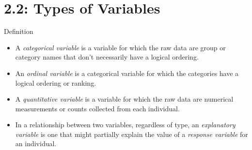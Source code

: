 \documentclass[Lecture.tex]{subfiles}
\begin{document}
\section{2.2: Types of Variables}
\begin{frame}{Definition}
  \begin{defn}
    \begin{itemize}
    \item<1->
      A {\it categorical variable} is a variable for which the raw data are group or category names that don't necessarily have a logical ordering.
    \item<2->
      An {\it ordinal variable} is a categorical variable for which the categories have a logical ordering or ranking.
    \item<3->
      A {\it quantitative variable} is a variable for which the raw data are numerical measurements or counts collected from each individual.
    \item<4-> In a relationship between two variables, regardless of type, an {\it explanatory variable} is one that might partially explain the value of a {\it response variable} for an individual.
    \end{itemize}
  \end{defn}
\end{frame}
\end{document}
